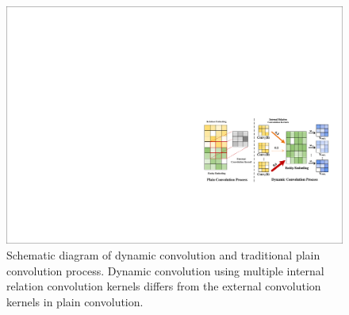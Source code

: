\documentclass[letterpaper]{article} %
\begin{document}
\begin{figure}[!t]
\centering
\includegraphics[width=\linewidth]{figure/motivation.pdf}
\caption{Schematic diagram of dynamic convolution and traditional plain convolution process. Dynamic convolution using multiple internal relation convolution kernels differs from the external convolution kernels in plain convolution.}
\label{fig:motivation}
\end{figure}
\end{document}
